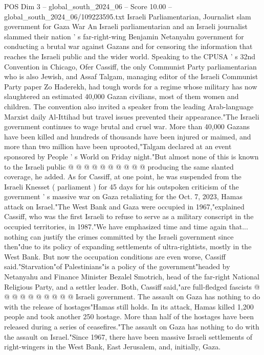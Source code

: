\begin{textsample}{POS Dim 3 – global\_south\_2024\_06 – Score 10.00 – global\_south\_2024\_06/109223595.txt}  \label{ex:f3_pos_345}
Israeli Parliamentarian, Journalist slam government for Gaza War An Israeli parliamentarian and an Israeli journalist slammed their nation ' s far-right-wing Benjamin Netanyahu government for conducting a brutal war against Gazans and for censoring the information that reaches the Israeli public and the wider world.
Speaking to the CPUSA ' s 32nd Convention in Chicago, Ofer Cassiff, the only Communist Party parliamentarian who is also Jewish, and Assaf Talgam, managing editor of the Israeli Communist Party paper Zo Haderekh, had tough words for a regime whose military has now slaughtered an estimated 40,000 Gazan civilians, most of them women and children.
The convention also invited a speaker from the leading Arab-language Marxist daily Al-Ittihad but travel issues prevented their appearance."The Israeli government continues to wage brutal and cruel war.
More than 40,000 Gazans have been killed and hundreds of thousands have been injured or maimed, and more than two million have been uprooted,"Talgam declared at an event sponsored by People ' s World on Friday night."But almost none of this is known to the Israeli public @ @ @ @ @ @ @ @ @ @ producing the same slanted coverage, he added.
As for Cassiff, at one point, he was suspended from the Israeli Knesset ( parliament ) for 45 days for his outspoken criticism of the government ' s massive war on Gaza retaliating for the Oct. 7, 2023, Hamas attack on Israel."The West Bank and Gaza were occupied in 1967,"explained Cassiff, who was the first Israeli to refuse to serve as a military conscript in the occupied territories, in 1987."We have emphasized time and time again that... nothing can justify the crimes committed by the Israeli government since then"due to its policy of expanding settlements of ultra-rightists, mostly in the West Bank.
But now the occupation conditions are even worse, Cassiff said."Starvation"of Palestinians"is a policy of the government"headed by Netanyahu and Finance Minister Bezalel Smotrich, head of the far-right National Religious Party, and a settler leader.
Both, Cassiff said,"are full-fledged fascists @ @ @ @ @ @ @ @ @ @ Israeli government.
The assault on Gaza has nothing to do with the release of hostages"Hamas still holds.
In its attack, Hamas killed 1,200 people and took another 250 hostage.
More than half of the hostages have been released during a series of ceasefires."The assault on Gaza has nothing to do with the assault on Israel."Since 1967, there have been massive Israeli settlements of right-wingers in the West Bank, East Jerusalem, and, initially, Gaza.

\end{textsample}
